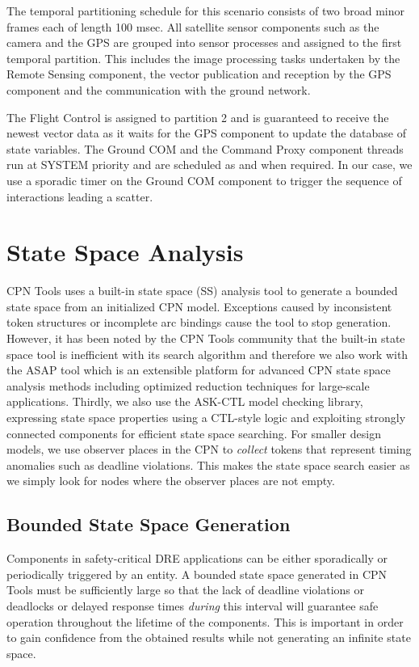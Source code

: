 The temporal partitioning schedule for this scenario consists of two broad minor frames each of length 100 msec. All satellite sensor components such as the camera and the GPS are grouped into sensor processes and assigned to the first temporal partition. This includes the image processing tasks undertaken by the Remote Sensing component, the vector publication and reception by the GPS component and the communication with the ground network. 

The Flight Control is assigned to partition 2 and is guaranteed to receive the newest vector data as it waits for the GPS component to update the database of state variables. The Ground COM and the Command Proxy component threads run at SYSTEM priority and are scheduled as and when required. In our case, we use a sporadic timer on the Ground COM component to trigger the sequence of interactions leading a scatter.

\section{State Space Analysis}

CPN Tools uses a built-in state space (SS) analysis tool to generate a bounded state space from an initialized CPN model. Exceptions caused by inconsistent token structures or incomplete arc bindings cause the tool to stop generation. However, it has been noted by the CPN Tools community that the built-in state space tool is inefficient with its search algorithm \cite{CPNTwoInterfaces} and therefore we also work with the ASAP tool \cite{ASAP} which is an extensible platform for advanced CPN state space analysis methods including optimized reduction techniques for large-scale applications. Thirdly, we also use the ASK-CTL \cite{ASK-CTL} model checking library, expressing state space properties using a CTL-style logic and exploiting strongly connected components for efficient state space searching. For smaller design models, we use observer places \cite{Alpern1989} in the CPN to \emph{collect} tokens that represent timing anomalies such as deadline violations. This makes the state space search easier as we simply look for nodes where the observer places are not empty. 

\subsection{Bounded State Space Generation}

Components in safety-critical DRE applications can be either sporadically or periodically triggered by an entity. A bounded state space generated in CPN Tools must be sufficiently large so that the lack of deadline violations or deadlocks or delayed response times \emph{during} this interval will guarantee safe operation throughout the lifetime of the components. This is important in order to gain confidence from the obtained results while not generating an infinite state space. 

